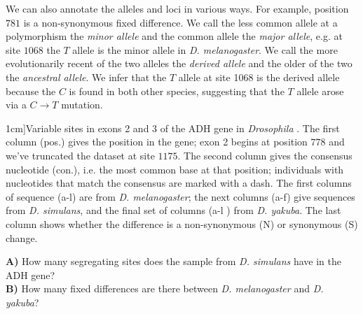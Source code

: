 We can also annotate the alleles and loci in various ways. For example, position
$781$ is a non-synonymous fixed difference. We call the less common
allele at a polymorphism the  \emph{minor allele} and the common
allele the \emph{major allele}, e.g. at site $1068$ the $T$ allele is the
minor allele in {\it D. melanogaster}. We call the more evolutionarily
recent of the two alleles the \emph{derived allele} and the older of
the two the \emph{ancestral allele}. We infer that the $T$ allele at site 1068 is
the derived allele because the $C$ is found in both other species,
suggesting that the $T$ allele arose via a $C \rightarrow T$ mutation.


\begin{table}
  \begin{center}
  \small
\setlength{\tabcolsep}{.55 \tabcolsep}   %
\end{center}
\caption[][1cm]{Variable sites in exons 2 and 3 of the ADH gene in {\it Drosophila} \citet{mcdonald:91}.
The first column (pos.) gives the position in the gene; exon 2 begins at
position $778$ and we've truncated the dataset at site $1175$.
The second column gives the consensus nucleotide (con.), i.e. the most
common base at that position; individuals with nucleotides that match
the consensus are marked with a dash.  The first columns of sequence
(a-l) are from {\it D. melanogaster};
    the next columns (a-f) give sequences from \textit{D. simulans}, and the final
 set of columns (a-l ) from {\it D. yakuba}. The last column shows
 whether the difference is a non-synonymous (N) or synonymous (S) change. }  %
  \label{Table:ADH}
\end{table}

\begin{question}{}
{\bf A)} How many segregating sites does the sample from \textit{
  D. simulans} have in the ADH gene?\\
{\bf B)} How many fixed differences are there between \textit{D. melanogaster} and \textit{D. yakuba}?
\end{question}

